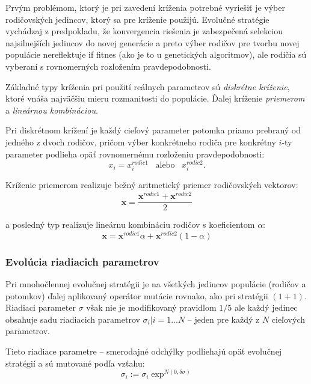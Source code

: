 \documentclass[12pt, a4paper]{article}
\begin{document}
Prvým problémom, ktorý je pri zavedení kríženia potrebné vyriešiť je výber rodičovských jedincov, ktorý sa pre kríženie použijú. Evolučné stratégie vychádzaj z predpokladu, že konvergencia riešenia je zabezpečená selekciou najsilnejších jedincov do novej generácie a preto výber rodičov pre tvorbu novej populácie nereflektuje if fitnes (ako je to u genetických algoritmov), ale rodičia sú vyberaní s rovnomerných rozložením pravdepodobnosti.

Základné typy kríženia pri použití reálnych parametrov sú \emph{diskrétne kríženie}, ktoré vnáša najväčšiu mieru rozmanitosti do populácie. Ďalej kríženie \emph{priemerom} a \emph{lineárnou kombináciou}.

Pri diskrétnom krížení je každý cieľový parameter potomka priamo prebraný od jedného z dvoch rodičov, pričom výber konkrétneho rodiča pre konkrétny $i$-ty parameter podlieha opäť rovnomernému rozloženiu pravdepodobnosti:
\begin{equation}
	x_i = x_i^{rodic1} \;\;\; \mbox{alebo} \;\;\; x_i^{rodic2}.
\end{equation}

Kríženie priemerom realizuje bežný aritmetický priemer rodičovských vektorov:
\begin{equation}
	\mathbf{x} = \dfrac{\mathbf{x}^{rodic1} + \mathbf{x}^{rodic2}}{2}
\end{equation}

a posledný typ realizuje lineárnu kombináciu rodičov s koeficientom $\alpha$:
\begin{equation}
	\mathbf{x} = \mathbf{x}^{rodic1}\alpha + \mathbf{x}^{rodic2}(1-\alpha)
\end{equation}

\subsubsection{Evolúcia riadiacich parametrov}
Pri mnohočlennej evolučnej stratégii je na všetkých jedincov populácie (rodičov a potomkov) ďalej aplikovaný operátor mutácie rovnako, ako pri stratégii $(1+1)$. Riadiaci parameter $\sigma$ však nie je modifikovaný pravidlom $1/5$ ale každý jedinec obsahuje sadu riadiacich parametrov ${\sigma_i | i = 1 ... N}$ -- jeden pre každý z $N$ cieľových parametrov.

Tieto riadiace parametre -- smerodajné odchýlky podliehajú opäť evolučnej stratégií a sú mutované podľa vzťahu:
\begin{equation}
	\sigma_i := \sigma_i\exp^{N(0, \delta\sigma)}
\end{equation}
\end{document}
